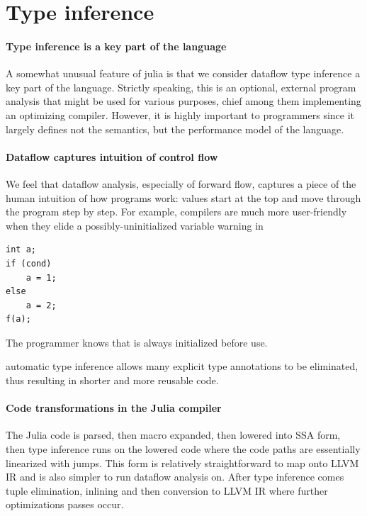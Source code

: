 \documentclass[pldi]{sigplanconf-pldi15}
\begin{document}
\section{Type inference}

\paragraph{Type inference is a key part of the language}
A somewhat unusual feature of julia is that we consider dataflow type inference a
key part of the language. Strictly speaking, this is an optional, external program
analysis that might be used for various purposes, chief among them implementing
an optimizing compiler. However, it is highly important to programmers since it
largely defines not the semantics, but the performance model of the language.

\paragraph{Dataflow captures intuition of control flow}
We feel that dataflow analysis, especially of forward flow, captures a piece of
the human intuition of how programs work: values start at the top and move through
the program step by step. For example, compilers are much more user-friendly
when they elide a possibly-uninitialized variable warning in

\begin{verbatim}
int a;
if (cond)
    a = 1;
else
    a = 2;
f(a);
\end{verbatim}

The programmer knows that  is always initialized before use.

automatic type inference allows many
explicit type annotations to be eliminated, thus resulting in shorter and more
reusable code.

\paragraph{Code transformations in the Julia compiler}
The Julia code is parsed, then macro expanded, then lowered into SSA form, then
type inference runs on the lowered code where the code paths are essentially
linearized with jumps. This form is relatively straightforward to map onto LLVM
IR and is also simpler to run dataflow analysis on. After type inference comes
tuple elimination, inlining and then conversion to LLVM IR where further
optimizations passes occur.
\end{document}
